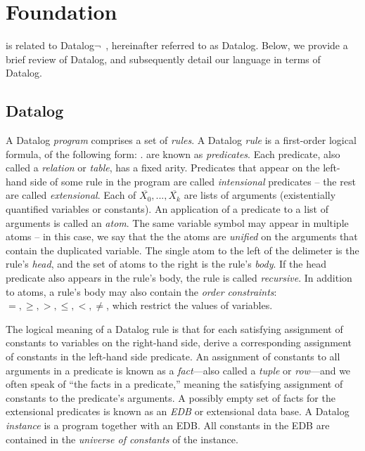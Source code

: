 \section{Foundation}
\label{sec:lang}

\lang is related to Datalog$\lnot$~\cite{ullmanbook}, hereinafter referred to
as Datalog.
Below, we provide a brief review of Datalog, and subsequently detail our
language in terms of Datalog.

\subsection{Datalog}
\label{sec:datalog}

A Datalog {\em program} comprises a set of {\em rules}.  A Datalog {\em rule}
is a first-order logical formula, of the following form:
.   are known as {\em
predicates}.  Each predicate, also called a {\em relation} or {\em table}, has
a fixed arity.  Predicates that appear on the left-hand side of some rule in
the program are called {\em intensional} predicates -- the rest are called {\em
extensional}.  Each of $\overline{X_0}, ..., \overline{X_k}$ are lists of
arguments (existentially quantified variables or constants).  An application of
a predicate to a list of arguments is called an {\em atom}.  The same variable
symbol may appear in multiple atoms -- in this case, we say that the the atoms
are {\em unified} on the arguments that contain the duplicated variable.  The
single atom to the left of the \dedalus{:-} delimeter is the rule's {\em head},
and the set of atoms to the right is the rule's {\em body}.  If the head
predicate also appears in the rule's body, the rule is called {\em recursive}.
In addition to atoms, a rule's body may also contain the {\em order
constraints}: $=, \geq, >, \leq, <, \neq$, which restrict the values of
variables.  

The logical meaning of a Datalog rule is that for each satisfying assignment of
constants to variables on the right-hand side, derive a corresponding
assignment of constants in the left-hand side predicate.  An assignment of
constants to all arguments in a predicate is known as a {\em fact}---also
called a {\em tuple} or {\em row}---and we often speak of ``the facts in a
predicate,'' meaning the satisfying assignment of constants to the predicate's
arguments.  A possibly empty set of facts for the extensional predicates is
known as an {\em EDB} or extensional data base.  A Datalog {\em instance} is a
program together with an EDB.  All constants in the EDB are contained in the
{\em universe of constants} of the instance.

